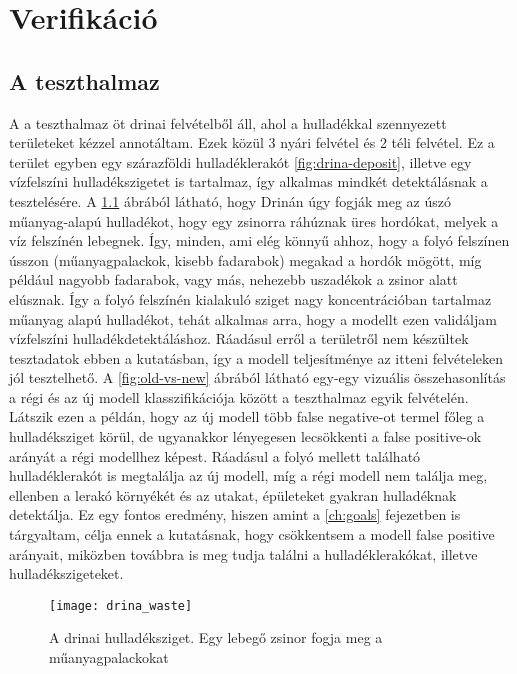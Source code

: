 \chapter {Verifikáció}
\label{ch:verification}

\section{A teszthalmaz}
\label{ch:test-set}

A a teszthalmaz öt drinai felvételből áll, ahol a hulladékkal szennyezett területeket kézzel annotáltam. Ezek közül 3 nyári felvétel és 2 téli felvétel. Ez a terület egyben egy szárazföldi hulladéklerakót \ref{fig:drina-deposit}, illetve egy vízfelszíni hulladékszigetet is tartalmaz, így alkalmas mindkét detektálásnak a tesztelésére. A \ref{fig:drina-floating-waste} ábrából látható, hogy Drinán úgy fogják meg az úszó műanyag-alapú hulladékot, hogy egy zsinorra ráhúznak üres hordókat, melyek a víz felszínén lebegnek. Így, minden, ami elég könnyű ahhoz, hogy a folyó felszínen ússzon (műanyagpalackok, kisebb fadarabok) megakad a hordók mögött, míg például nagyobb fadarabok, vagy más, nehezebb uszadékok a zsinor alatt elúsznak. Így a folyó felszínén kialakuló sziget nagy koncentrációban tartalmaz műanyag alapú hulladékot, tehát alkalmas arra, hogy a modellt ezen validáljam vízfelszíni hulladékdetektáláshoz. Ráadásul erről a területről nem készültek tesztadatok ebben a kutatásban, így a modell teljesítménye az itteni felvételeken jól tesztelhető. A \ref{fig:old-vs-new} ábrából látható egy-egy vizuális összehasonlítás a régi és az új modell klasszifikációja között a teszthalmaz egyik felvételén. Látszik ezen a példán, hogy az új modell több false negative-ot termel főleg a hulladéksziget körül, de ugyanakkor lényegesen lecsökkenti a false positive-ok arányát a régi modellhez képest. Ráadásul a folyó mellett található hulladéklerakót is megtalálja az új modell, míg a régi modell nem találja meg, ellenben a lerakó környékét és az utakat, épületeket gyakran hulladéknak detektálja. Ez egy fontos eredmény, hiszen amint a \ref{ch:goals} fejezetben is tárgyaltam, célja ennek a kutatásnak, hogy csökkentsem a modell false positive arányait, miközben továbbra is meg tudja találni a hulladéklerakókat, illetve hulladékszigeteket.

\begin{figure}[H]
	\centering
	\texttt{[image: drina\_waste]}
	\caption{A drinai hulladéksziget. Egy lebegő zsinor fogja meg a műanyagpalackokat \cite{euronews2024}}
    \label{fig:drina-floating-waste}
\end{figure}

